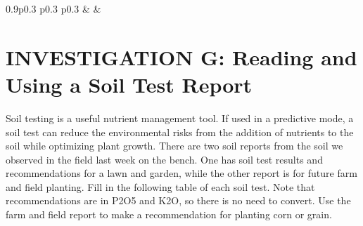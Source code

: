 \documentclass[
  letterpaper,
  twocolumn,
  portrait]{scrbook}
\begin{document}
\begin{table}[h!]
\begin{centerbox}
\begin{threeparttable}
\begin{tabularx}{0.9\textwidth}{p{} p{} p{}}
 &
 &
 \tabularnewline[-0.5pt]


\end{tabularx}
\end{threeparttable}\par\end{centerbox}

\end{table}
 

\hypertarget{investigation-g-reading-and-using-a-soil-test-report}{%
\section{INVESTIGATION G: Reading and Using a Soil Test
Report}\label{investigation-g-reading-and-using-a-soil-test-report}}

Soil testing is a useful nutrient management tool. If used in a
predictive mode, a soil test can reduce the environmental risks from the
addition of nutrients to the soil while optimizing plant growth. There
are two soil reports from the soil we observed in the field last week on
the bench. One has soil test results and recommendations for a lawn and
garden, while the other report is for future farm and field planting.
Fill in the following table of each soil test. Note that recommendations
are in P2O5 and K2O, so there is no need to convert. Use the farm and
field report to make a recommendation for planting corn or grain.

 
  \providecommand{\huxb}[2]{\arrayrulecolor[RGB]{#1}\global\arrayrulewidth=#2pt}
  \providecommand{\huxvb}[2]{\color[RGB]{#1}\vrule width #2pt}
  \providecommand{\huxtpad}[1]{\rule{0pt}{#1}}
  \providecommand{\huxbpad}[1]{\rule[-#1]{0pt}{#1}}
\end{document}
